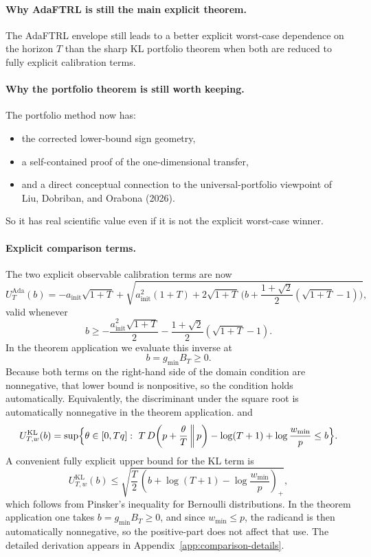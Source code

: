 \documentclass[11pt]{article}
\newcommand{\1}{\mathbf{1}}
\begin{document}
\paragraph{Why AdaFTRL is still the main explicit theorem.}
The AdaFTRL envelope still leads to a better explicit worst-case dependence on the horizon \(T\) than the sharp KL portfolio theorem when both are reduced to fully explicit calibration terms.

\paragraph{Why the portfolio theorem is still worth keeping.}
The portfolio method now has:
\begin{itemize}[leftmargin=*,itemsep=2pt]
  \item the corrected lower-bound sign geometry,
  \item a self-contained proof of the one-dimensional transfer,
  \item and a direct conceptual connection to the universal-portfolio viewpoint of Liu, Dobriban, and Orabona (2026).
\end{itemize}
So it has real scientific value even if it is not the explicit worst-case winner.

\paragraph{Explicit comparison terms.}
The two explicit observable calibration terms are now
\[
U_T^{\mathrm{Ada}}(b)
=
-a_{\mathrm{init}}\sqrt{1+T}
+
\sqrt{
a_{\mathrm{init}}^2(1+T)
+
2\sqrt{1+T}\,\bigl(b+\frac{1+\sqrt{2}}{2}(\sqrt{1+T}-1)\bigr)
},
\]
valid whenever
\[
b\ge -\frac{a_{\mathrm{init}}^2\sqrt{1+T}}{2}-\frac{1+\sqrt{2}}{2}(\sqrt{1+T}-1).
\]
In the theorem application we evaluate this inverse at
\[
b=g_{\min}B_T\ge 0.
\]
Because both terms on the right-hand side of the domain condition are nonnegative, that lower bound is nonpositive, so the condition holds automatically. Equivalently, the discriminant under the square root is automatically nonnegative in the theorem application.
and
\[
U_{T,w}^{\mathrm{KL}}(b)
=
\sup\Bigl\{
\theta\in[0,Tq]:
\ T\,D\!\left(p+\frac{\theta}{T}\,\middle\|\,p\right)-\log(T+1)+\log\frac{w_{\min}}{p}\le b
\Bigr\}.
\]
A convenient fully explicit upper bound for the KL term is
\[
U_{T,w}^{\mathrm{KL}}(b)
\le
\sqrt{\frac{T}{2}\,\left(b+\log(T+1)-\log\frac{w_{\min}}{p}\right)_+},
\]
which follows from Pinsker's inequality for Bernoulli distributions. In the theorem application one takes $b=g_{\min}B_T\ge 0$, and since $w_{\min}\le p$, the radicand is then automatically nonnegative, so the positive-part does not affect that use. The detailed derivation appears in Appendix~\ref{app:comparison-details}.
\end{document}
